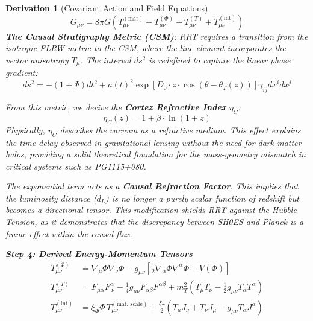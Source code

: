 \documentclass[10pt, a4paper]{article}
\newcommand{\xiphi}{\xi_\Phi}  %
\newcommand{\xiT}{\xi_T}       %
\newtheorem{derivation}{Derivation}
\begin{document}
\begin{derivation}[Covariant Action and Field Equations]
\begin{equation}
G_{\mu\nu} = 8\pi G \left( T_{\mu\nu}^{(\text{mat})} + T_{\mu\nu}^{(\Phi)} + T_{\mu\nu}^{(T)} + T_{\mu\nu}^{(\text{int})} \right)
\tag{1.5}
\end{equation}
\textbf{The Causal Stratigraphy Metric (CSM)}: 
RRT requires a transition from the isotropic FLRW metric to the CSM, where the line element incorporates the vector anisotropy $T_\mu$. The interval $ds^2$ is redefined to capture the linear phase gradient:
\begin{equation}
ds^2 = -(1 + \Psi) dt^2 + a(t)^2 \exp\left[ D_0 \cdot z \cdot \cos(\theta - \theta_T(z)) \right] \gamma_{ij} dx^i dx^j
\tag{1.5.1}
\end{equation}

From this metric, we derive the \textbf{Cortez Refractive Index} $\eta_C$:
\begin{equation}
\eta_C(z) = 1 + \beta \cdot \ln(1 + z)
\tag{1.5.2}
\end{equation}
Physically, $\eta_C$ describes the vacuum as a refractive medium. This effect explains the time delay observed in gravitational lensing without the need for dark matter halos, providing a solid theoretical foundation for the mass-geometry mismatch in critical systems such as PG1115+080.

The exponential term acts as a \textbf{Causal Refraction Factor}. This implies that the luminosity distance ($d_L$) is no longer a purely scalar function of redshift but becomes a directional tensor. This modification shields RRT against the Hubble Tension, as it demonstrates that the discrepancy between SH0ES and Planck is a frame effect within the causal flux.

\textbf{Step 4: Derived Energy-Momentum Tensors}
\begin{align}
T_{\mu\nu}^{(\Phi)} &= \nabla_\mu \Phi \nabla_\nu \Phi - g_{\mu\nu} \left[ \frac{1}{2} \nabla_\alpha \Phi \nabla^\alpha \Phi + V(\Phi) \right]
\tag{1.6} \\
T_{\mu\nu}^{(T)} &= F_{\mu\alpha} F^\alpha_{\ \nu} - \frac{1}{4} g_{\mu\nu} F_{\alpha\beta} F^{\alpha\beta} + m_T^2 \left( T_\mu T_\nu - \frac{1}{2} g_{\mu\nu} T_\alpha T^\alpha \right)
\tag{1.7} \\
T_{\mu\nu}^{(\text{int})} &= \xiphi \Phi \, T_{\mu\nu}^{(\text{mat, scale})} + \frac{\xiT}{2} \left( T_\mu J_\nu + T_\nu J_\mu - g_{\mu\nu} T_\alpha J^\alpha \right)
\tag{1.8}
\end{align}


\end{derivation}
\end{document}
